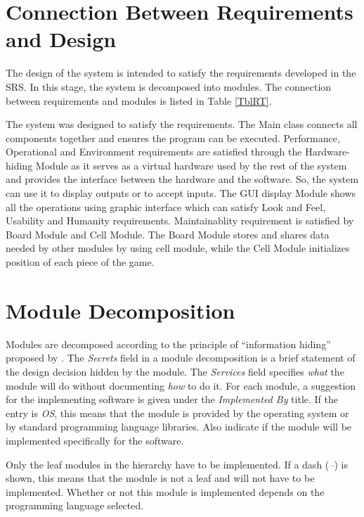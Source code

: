 \documentclass[12pt, titlepage]{article}
\begin{document}
\section{Connection Between Requirements and Design} \label{SecConnection}

The design of the system is intended to satisfy the requirements developed in
the SRS. In this stage, the system is decomposed into modules. The connection
between requirements and modules is listed in Table \ref{TblRT}.


The system was designed to satisfy the requirements. The Main class connects all components together and ensures the program can be executed. Performance, Operational and Environment requirements are satisfied through the Hardware-hiding Module as it serves as a virtual hardware used by the rest of the system and provides the interface between the hardware and the software. So, the system can use it to display outputs or to accept inputs. The GUI display Module shows all the operations using graphic interface which can satisfy Look and Feel, Usability and Humanity requirements. Maintainablity requirement is satisfied by Board Module and Cell Module. The Board Module stores and shares data needed by other modules by using cell module, while the Cell Module initializes position of each piece of the game. 


\section{Module Decomposition} \label{SecMD}

Modules are decomposed according to the principle of ``information hiding''
proposed by \citet{ParnasEtAl1984}. The \emph{Secrets} field in a module
decomposition is a brief statement of the design decision hidden by the
module. The \emph{Services} field specifies \emph{what} the module will do
without documenting \emph{how} to do it. For each module, a suggestion for the
implementing software is given under the \emph{Implemented By} title. If the
entry is \emph{OS}, this means that the module is provided by the operating
system or by standard programming language libraries.  Also indicate if the
module will be implemented specifically for the software.

Only the leaf modules in the hierarchy have to be implemented. If a dash (\emph{--}) is shown, this means that the module is not a leaf and will not have to be implemented. Whether or not this module is implemented depends on the programming language selected.
\end{document}
